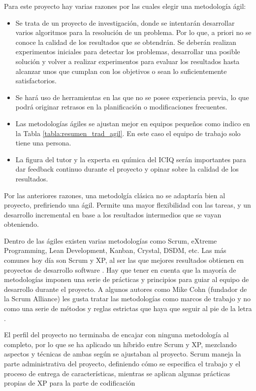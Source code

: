 Para este proyecto hay varias razones por las cuales elegir una metodología ágil:
\begin{itemize}
    \item Se trata de un proyecto de investigación, donde se intentarán desarrollar varios algoritmos para la resolución de un problema. Por lo que, a priori no se conoce la calidad de los resultados que se obtendrán. Se deberán realizan experimentos iniciales para detectar los problemas, desarrollar una posible solución y volver a realizar experimentos para evaluar los resultados hasta alcanzar unos que cumplan con los objetivos o sean lo suficientemente satisfactorios.
    \item Se hará uso de herramientas en las que no se posee experiencia previa, lo que podrá originar retrasos en la planificación o modificaciones frecuentes.
    \item Las metodologías ágiles se ajustan mejor en equipos pequeños como indico en la Tabla \ref{tabla:resumen_trad_agil}. En este caso el equipo de trabajo solo tiene una persona.
    \item La figura del tutor y la experta en química del ICIQ serán importantes para dar feedback continuo durante el proyecto y opinar sobre la calidad de los resultados.
\end{itemize}

Por las anteriores razones, una metodolgía clásica no se adaptaría bien al proyecto, prefiriendo una ágil. Permite una mayor flexibilidad con las tareas, y un desarrollo incremental en base a los resultados intermedios que se vayan obteniendo.


Dentro de las ágiles existen varias metodologías como Scrum, eXtreme Programming, Lean Development, Kanban, Crystal, DSDM, etc. Las más comunes hoy día son Scrum y XP, al ser las que mejores resultados obtienen en proyectos de desarrollo software \cite{15_agile_report, fuior_key_2019, despa_comparative_2014, mishra_organizational_2021}. Hay que tener en cuenta que la mayoría de metodologías imponen una serie de prácticas y principios para guiar al equipo de desarrollo durante el proyecto. A algunos autores como Mike Cohn (fundador de la Scrum Alliance) les gusta tratar las metodologías como marcos de trabajo y no como una serie de métodos y reglas estrictas que haya que seguir al pie de la letra \cite{cohn_differences_2007}. 

El perfil del proyecto no terminaba de encajar con ninguna metodología al completo, por lo que se ha aplicado un híbrido entre Scrum y XP, mezclando aspectos y técnicas de ambas según se ajustaban al proyecto. Scrum maneja la parte administrativa del proyecto, definiendo cómo se especifica el trabajo y el proceso de entrega de características, mientras se aplican algunas prácticas propias de XP para la parte de codificación\cite{salazar_scrum_2018, linkedin_hybrid_xp_scrum}


